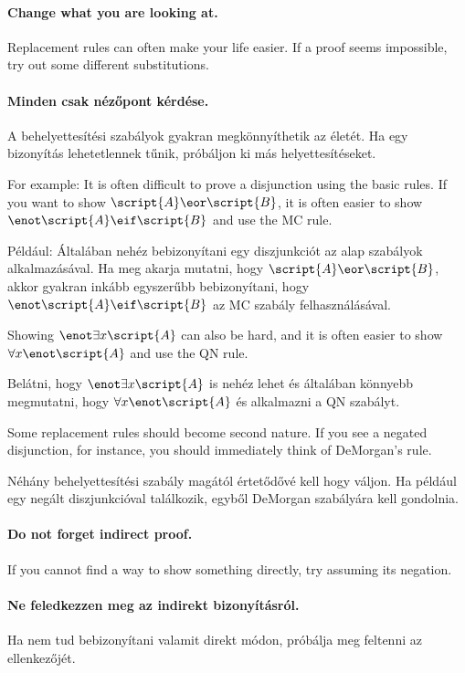\paragraph{Change what you are looking at.}
Replacement rules can often make your life easier. If a proof seems impossible, try out some different substitutions.

\paragraph{Minden csak nézőpont kérdése.}
A behelyettesítési szabályok gyakran megkönnyíthetik az életét. Ha egy bizonyítás lehetetlennek tűnik, próbáljon ki más helyettesítéseket.

For example: It is often difficult to prove a disjunction using the basic rules. If you want to show $\script{A}\eor\script{B}$, it is often easier to show $\enot\script{A}\eif\script{B}$ and use the MC rule.

Például: Általában nehéz bebizonyítani egy diszjunkciót az alap szabályok alkalmazásával. Ha meg akarja mutatni, hogy $\script{A}\eor\script{B}$, akkor gyakran inkább egyszerűbb bebizonyítani, hogy $\enot\script{A}\eif\script{B}$ az MC szabály felhasználásával.

Showing $\enot \exists x\script{A}$ can also be hard, and it is often easier to show  $\forall x\enot \script{A}$ and use the QN rule.

Belátni, hogy $\enot \exists x\script{A}$ is nehéz lehet és általában könnyebb megmutatni, hogy $\forall x\enot \script{A}$ és alkalmazni a QN szabályt.

Some replacement rules should become second nature. If you see a negated disjunction, for instance, you should immediately think of DeMorgan's rule.

Néhány behelyettesítési szabály magától értetődővé kell hogy váljon. Ha például egy negált diszjunkcióval találkozik, egyből DeMorgan szabályára kell gondolnia.

\paragraph{Do not forget indirect proof.}
If you cannot find a way to show something directly, try assuming its negation.

\paragraph{Ne feledkezzen meg az indirekt bizonyításról.}
Ha nem tud bebizonyítani valamit direkt módon, próbálja meg feltenni az ellenkezőjét.


